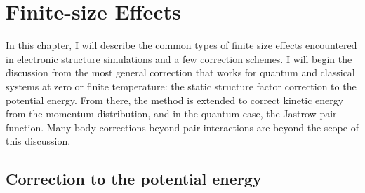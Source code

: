 \chapter{Finite-size Effects}

In this chapter, I will describe the common types of finite size effects encountered in electronic structure simulations and a few correction schemes. I will begin the discussion from the most general correction that works for quantum and classical systems at zero or finite temperature: the static structure factor correction to the potential energy. From there, the method is extended to correct kinetic energy from the momentum distribution, and in the quantum case, the Jastrow pair function. %
Many-body corrections beyond pair interactions are beyond the scope of this discussion.

\section{Correction to the potential energy}

